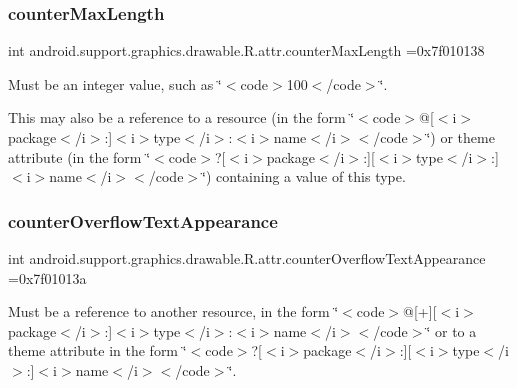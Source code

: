 \subsubsection{\texorpdfstring{counter\+Max\+Length}{counterMaxLength}}
{\footnotesize\ttfamily int android.\+support.\+graphics.\+drawable.\+R.\+attr.\+counter\+Max\+Length =0x7f010138\hspace{0.3cm}{\ttfamily [static]}}

Must be an integer value, such as \char`\"{}$<$code$>$100$<$/code$>$\char`\"{}. 

This may also be a reference to a resource (in the form \char`\"{}$<$code$>$@\mbox{[}$<$i$>$package$<$/i$>$\+:\mbox{]}$<$i$>$type$<$/i$>$\+:$<$i$>$name$<$/i$>$$<$/code$>$\char`\"{}) or theme attribute (in the form \char`\"{}$<$code$>$?\mbox{[}$<$i$>$package$<$/i$>$\+:\mbox{]}\mbox{[}$<$i$>$type$<$/i$>$\+:\mbox{]}$<$i$>$name$<$/i$>$$<$/code$>$\char`\"{}) containing a value of this type. \mbox{\label{classandroid_1_1support_1_1graphics_1_1drawable_1_1R_1_1attr_a75aecb525f12edc568e4337d316eb08f}} 
\subsubsection{\texorpdfstring{counter\+Overflow\+Text\+Appearance}{counterOverflowTextAppearance}}
{\footnotesize\ttfamily int android.\+support.\+graphics.\+drawable.\+R.\+attr.\+counter\+Overflow\+Text\+Appearance =0x7f01013a\hspace{0.3cm}{\ttfamily [static]}}

Must be a reference to another resource, in the form \char`\"{}$<$code$>$@\mbox{[}+\mbox{]}\mbox{[}$<$i$>$package$<$/i$>$\+:\mbox{]}$<$i$>$type$<$/i$>$\+:$<$i$>$name$<$/i$>$$<$/code$>$\char`\"{} or to a theme attribute in the form \char`\"{}$<$code$>$?\mbox{[}$<$i$>$package$<$/i$>$\+:\mbox{]}\mbox{[}$<$i$>$type$<$/i$>$\+:\mbox{]}$<$i$>$name$<$/i$>$$<$/code$>$\char`\"{}. \mbox{\label{classandroid_1_1support_1_1graphics_1_1drawable_1_1R_1_1attr_abdfe047dc453bc86dfe7a9b6d662f470}} 
